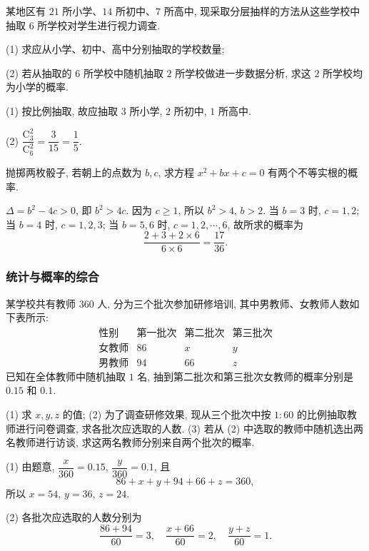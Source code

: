 \lianxi
\begin{exercise}
    某地区有 $21$ 所小学、$14$ 所初中、$7$ 所高中, 现采取分层抽样的方法从这些学校中抽取 $6$ 所学校对学生进行视力调查.
    
    (1) 求应从小学、初中、高中分别抽取的学校数量;
    
    (2) 若从抽取的 $6$ 所学校中随机抽取 $2$ 所学校做进一步数据分析, 求这 $2$ 所学校均为小学的概率.
\end{exercise}
\beginsolution
    (1) 按比例抽取, 故应抽取 $3$ 所小学, $2$ 所初中, $1$ 所高中.

    (2) $\dfrac{\mathrm{C}_3^2}{\mathrm{C}_6^2}= \dfrac3{15}= \dfrac15$.
\endsolution

\begin{exercise}
    抛掷两枚骰子, 若朝上的点数为 $b, c$, 求方程 $x^2 +bx+c=0$ 有两个不等实根的概率.
\end{exercise}
\beginsolution
    $\Delta= b^2- 4c> 0$, 即 $b^2>4c$. 因为 $c\geqslant 1$, 所以 $b^2>4$, $b>2$. 当 $b=3$ 时, $c= 1,2$; 当 $b=4$ 时, $c= 1,2,3$; 当 $b=5,6$ 时, $c= 1,2,\cdots,6$, 故所求的概率为
    \[\frac{2+3+2\times 6}{6\times 6}= \frac{17}{36}.\]
\endsolution

\subsubsection{统计与概率的综合}
\begin{example}
    某学校共有教师 $360$ 人, 分为三个批次参加研修培训, 其中男教师、女教师人数如下表所示:
    \[\begin{array}{c|ccc}
        \text{性别} & \text{第一批次} & \text{第二批次} & \text{第三批次}\\\hline
        \text{女教师} & 86 & x & y \\
        \text{男教师} & 94 & 66 & z
      \end{array}\]
    已知在全体教师中随机抽取 $1$ 名, 抽到第二批次和第三批次女教师的概率分别是 $0.15$ 和 $0.1$.
    
    (1) 求 $x, y, z$ 的值;\qquad
    (2) 为了调查研修效果, 现从三个批次中按 $1:60$ 的比例抽取教师进行问卷调查, 求各批次应选取的人数.\qquad
    (3) 若从 (2) 中选取的教师中随机选出两名教师进行访谈, 求这两名教师分别来自两个批次的概率.
\end{example}
\beginsolution
    (1) 由题意, $\dfrac{x}{360}= 0.15$, $\dfrac{y}{360}= 0.1$, 且
    \[86+x+y+ 94+66+z= 360,\]
    所以 $x=54$, $y=36$, $z=24$.

    (2) 各批次应选取的人数分别为
    \[\frac{86+94}{60}= 3,\quad
    \frac{x+66}{60}= 2,\quad
    \frac{y+z}{60}= 1.\]


